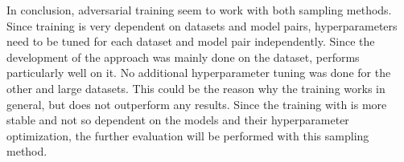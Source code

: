 In conclusion, adversarial training seem to work with both sampling methods.
Since training is very dependent on datasets and model pairs, hyperparameters need to be tuned for each dataset and model pair independently.
Since the development of the approach was mainly done on the \umls dataset, \ussoftmax performs particularly well on it.
No additional hyperparameter tuning was done for the other and large datasets.
This could be the reason why the training works in general, but does not outperform any results.
Since the training with \ussoftmax is more stable and not so dependent on the models and their hyperparameter optimization, the further evaluation will be performed with this sampling method.
